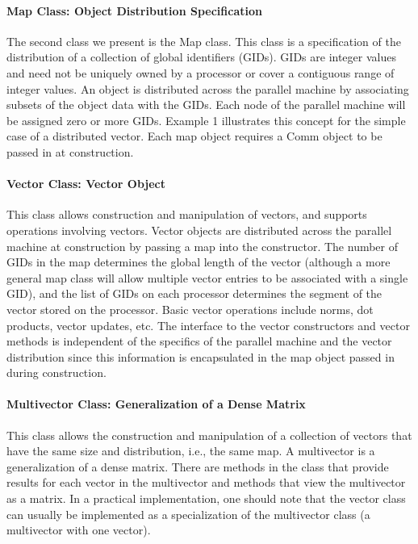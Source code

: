 \documentclass[12pt,relax]{PetraObjectModel}
\begin{document}
\paragraph{Map Class: Object Distribution Specification}

The second class we present is the Map class.  This class is a 
specification of the distribution of a collection of global identifiers 
(GIDs).  GIDs are integer values and need not be uniquely owned by a 
processor or cover a contiguous range of integer values.  An object is 
distributed across the parallel machine by associating subsets of the 
object data with the GIDs.  Each node of the parallel machine will be 
assigned zero or more GIDs.  Example 1 illustrates this concept for the 
simple case of a distributed vector.   Each map object requires a Comm 
object to be passed in at construction.

\paragraph{Vector Class:  Vector Object}

This class allows construction and manipulation of vectors, and supports 
operations involving vectors.  Vector objects are distributed across the 
parallel machine at construction by passing a map into the constructor.  
The number of GIDs in the map determines the global length of the vector 
(although a more general map class will allow multiple vector entries to 
be associated with a single GID), and the list of GIDs on each processor 
determines the segment of the vector stored on the processor.  Basic vector 
operations include norms, dot products, vector updates, etc.  The interface 
to the vector constructors and vector methods is independent of the specifics 
of the parallel machine and the vector distribution since this information is 
encapsulated in the map object passed in during construction.

\paragraph{Multivector Class:  Generalization of a Dense Matrix}

This class allows the construction and manipulation of a collection of 
vectors that have the same size and distribution, i.e., the same map.  
A multivector is a generalization of a dense matrix.  There are methods 
in the class that provide results for each vector in the multivector and 
methods that view the multivector as a matrix.  In a practical implementation, 
one should note that the vector class can usually be implemented as a 
specialization of the multivector class (a multivector with one vector).
\end{document}
